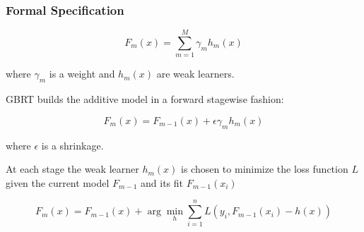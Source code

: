 \documentclass{beamer}
\begin{document}
\begin{frame}
    \frametitle{Formal Specification}
    \begin{equation}
    F_{m}(x) = \sum_{m=1}^{M}\gamma_{m}{h_{m}(x)}
    \end{equation}

    where $\gamma_{m}$ is a weight and $h_m(x)$ are weak learners.\\

\pause

GBRT builds the additive model in a forward stagewise fashion:

    \begin{equation}
    F_m(x) = F_{m-1}(x) + \epsilon \gamma_m h_m(x)
    \end{equation}

where $\epsilon$ is a shrinkage.  %
\pause
    
    At each stage the weak learner $h_m(x)$ is chosen to minimize the loss function $L$ given the current model $F_{m-1}$ and its fit $F_{m-1}(x_i)$

    \begin{equation}
    F_m(x) = F_{m-1}(x) + \arg\min_{h} \sum_{i=1}^{n} L(y_i, F_{m-1}(x_i) - h(x))
    \end{equation}

\end{frame}

%
%
%
%
%
%
\end{document}
